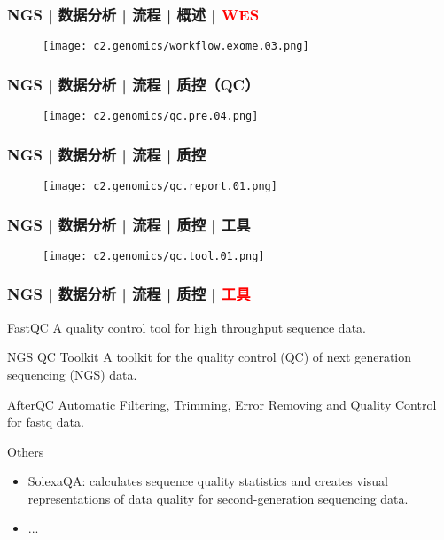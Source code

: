 \begin{frame}
  \frametitle{NGS | 数据分析 | 流程 | 概述 | \textcolor{red}{WES}}
  \begin{figure}
    \centering
    \texttt{[image: c2.genomics/workflow.exome.03.png]}
  \end{figure}
\end{frame}

\begin{frame}
  \frametitle{NGS | 数据分析 | 流程 | 质控（QC）}
  \begin{figure}
    \centering
    \texttt{[image: c2.genomics/qc.pre.04.png]}
  \end{figure}
\end{frame}

\begin{frame}
  \frametitle{NGS | 数据分析 | 流程 | 质控}
  \begin{figure}
    \centering
    \texttt{[image: c2.genomics/qc.report.01.png]}
  \end{figure}
\end{frame}

\begin{frame}
  \frametitle{NGS | 数据分析 | 流程 | 质控 | 工具}
  \begin{figure}
    \centering
    \texttt{[image: c2.genomics/qc.tool.01.png]}
  \end{figure}
\end{frame}

\begin{frame}
  \frametitle{NGS | 数据分析 | 流程 | 质控 | \textcolor{red}{工具}}
  \begin{block}{FastQC}
    A quality control tool for high throughput sequence data.
  \end{block}
  \vspace{-0.2em}
  \pause
  \begin{block}{NGS QC Toolkit}
    A toolkit for the quality control (QC) of next generation sequencing (NGS) data.
  \end{block}
  \vspace{-0.2em}
  \pause
  \begin{block}{AfterQC}
    Automatic Filtering, Trimming, Error Removing and Quality Control for fastq data.
  \end{block}
  \vspace{-0.2em}
  \pause
  \begin{block}{Others}
    \begin{itemize}
      \item SolexaQA: calculates sequence quality statistics and creates visual representations of data quality for second-generation sequencing data.
      \item ...
    \end{itemize}
  \end{block}
\end{frame}

